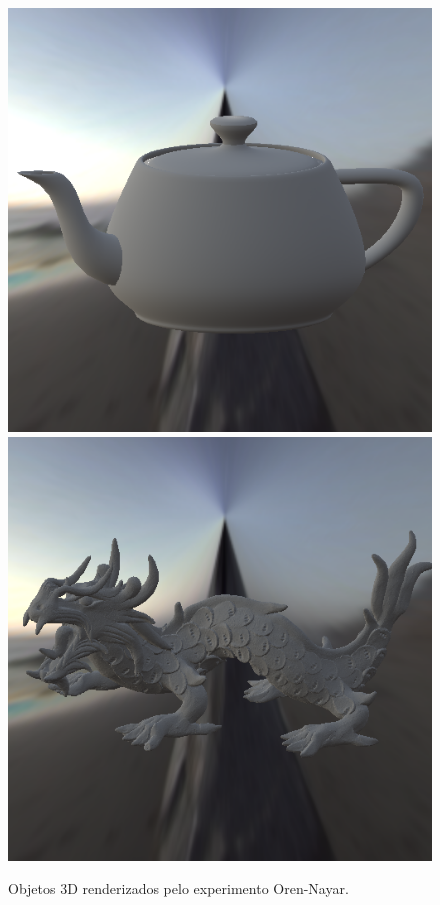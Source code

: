 \begin{figure}[H]
    \caption{\small{Objetos 3D renderizados pelo experimento Oren-Nayar.}}
    \label{fig-oren-nayar-eqlang}
  \includegraphics[width=\linewidth]{./Imagens/brdfs/oren-nayar-teapot.png}
\endminipage\hfill
{}
  \includegraphics[width=\linewidth]{./Imagens/brdfs/oren-nayar-dragon.png}

\end{figure}
